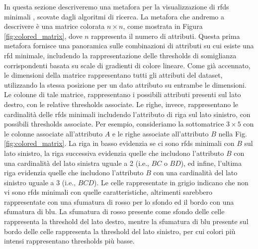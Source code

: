 In questa sezione descriveremo una metafora per la visualizzazione di \acrshort{rfds} minimali \cite{mdvisualization}, scovate dagli algoritmi di ricerca. La metafora che andremo a descrivere \`{e} una matrice colorata $n\times n$, come mostrata in Figura \ref{fig:colored_matrix}, dove $n$ rappresenta il numero di attributi. Questa prima metafora fornisce una panoramica sulle combinazioni di attributi su cui esiste una \acrshort{rfd} minimale, includendo la rappresentazione delle thresholds di somiglianza corrispondenti basata su scale di gradienti di colore lineare. Come gi\`{a} accennato, le dimensioni della matrice rappresentano tutti gli attributi del dataset, utilizzando la stessa posizione per un dato attributo su entrambe le dimensioni. Le colonne di tale matrice, rappresentano i possibili attributi presenti sul lato destro, con le relative thresholds associate. Le righe, invece, rappresentano le cardinalit\`{a} delle \acrshort{rfds} minimali includendo l'attributo di riga sul lato sinistro, con possibili thresholds associate. Per esempio, consideriamo la sottomatrice $3\times5$ con le colonne associate all'attributo $A$ e le righe associate all'attributo $B$ nella Fig. \ref{fig:colored_matrix}. La riga in basso evidenzia se ci sono \acrshort{rfds} minimali con $B$ sul lato sinistro, la riga successiva evidenzia quelle che includono l'attributo $B$ con una cardinalit\`{a} del lato sinistra uguale a 2 (i.e., $BC$ o $BD$), ed infine, l'ultima riga evidenzia quelle che includono l'attributo $B$ con una cardinalit\`{a} del lato sinistro uguale a 3 (i.e., $BCD$). Le celle rappresentate in grigio indicano che non vi sono \acrshort{rfds} minimali con quelle caratteristiche, altrimenti sarebbero rappresentate con una sfumatura di rosso per lo sfondo ed il bordo con una sfumatura di blu. La sfumatura di rosso presente come sfondo delle celle rappresenta la threshold del lato destro, mentre la sfumatura di blu presente sul bordo delle celle rappresenta la threshold del lato sinistro, per cui colori pi\`{u} intensi rappresentano thresholds pi\`{u} basse.\par
